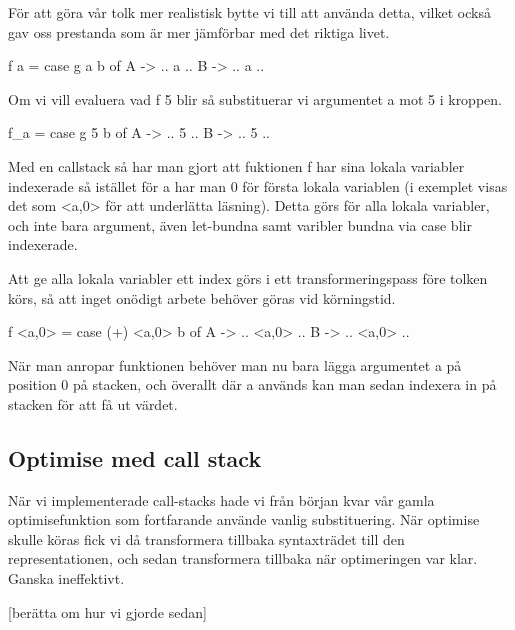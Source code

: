 \documentclass[Rapport]{subfiles}
\begin{document}
För att göra vår tolk mer realistisk bytte vi till att använda detta, vilket också
gav oss prestanda som är mer jämförbar med det riktiga livet.

\begin{codeEx}
f a = case g a b of
    A -> .. a ..
    B -> .. a ..
\end{codeEx}

Om vi vill evaluera vad f 5 blir så substituerar vi argumentet a mot 5 i kroppen.

\begin{codeEx}
f_a = case g 5 b of
    A -> .. 5 ..
    B -> .. 5 ..
\end{codeEx}

Med en callstack så har man gjort att fuktionen f har sina lokala variabler indexerade
så istället för a har man 0 för första lokala variablen (i exemplet visas det som
<a,0> för att underlätta läsning). Detta görs för alla lokala variabler, och inte
bara argument, även let-bundna samt varibler bundna via case blir indexerade.

Att ge alla lokala variabler ett index görs i ett transformeringspass före tolken körs,
så att inget onödigt arbete behöver göras vid körningstid.

\begin{codeEx}
f <a,0> = case (+) <a,0> b of
    A -> .. <a,0> ..
    B -> .. <a,0> ..
\end{codeEx}

När man anropar funktionen behöver man nu bara lägga argumentet a på position 0 på
stacken, och överallt där a används kan man sedan indexera in på stacken för att
få ut värdet.

\subsection{Optimise med call stack}

När vi implementerade call-stacks hade vi från början kvar vår gamla optimisefunktion
som fortfarande använde vanlig substituering. När optimise skulle köras fick vi då
transformera tillbaka syntaxträdet till den representationen, och sedan transformera
tillbaka när optimeringen var klar. Ganska ineffektivt.

[berätta om hur vi gjorde sedan]
\end{document}
